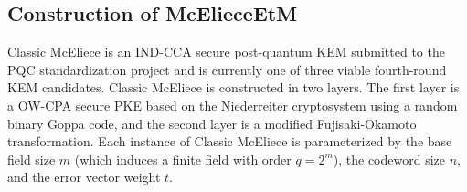 \documentclass[runningheads]{llncs}
\begin{document}
\subsection{Construction of McElieceEtM}\label{sec:classic-mceliece}
Classic McEliece \cite{ClassicMcEliece2022} is an IND-CCA secure post-quantum KEM submitted to the PQC standardization project and is currently one of three viable fourth-round KEM candidates. Classic McEliece is constructed in two layers. The first layer is a OW-CPA secure PKE based on the Niederreiter cryptosystem using a random binary Goppa code, and the second layer is a modified Fujisaki-Okamoto transformation. Each instance of Classic McEliece is parameterized by the base field size $m$ (which induces a finite field with order $q = 2^m$), the codeword size $n$, and the error vector weight $t$.
\end{document}
